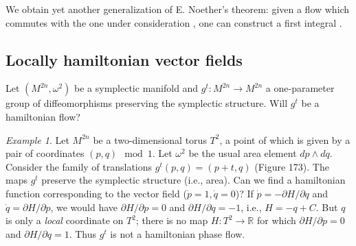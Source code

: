 \documentclass[leqno]{book}
\numberwithin{equation}{section}
\theoremstyle{plain}
\theoremstyle{definition}
\theoremstyle{remark}
\theoremstyle{smallcap}
\newtheorem*{ex*}{Example}
\numberwithin{prob}{section}
\begin{document}
We obtain yet another generalization of E. Noether's theorem:
given a flow 
which commutes with the one under consideration ,
one can construct a first integral .

\subsection{Locally hamiltonian vector fields}

Let $(M^{2n}, \omega^2)$ be a symplectic manifold and
$g^t: M^{2n} \rightarrow M^{2n}$
a one-parameter group of diffeomorphisms preserving
the symplectic structure.
%
Will $g^t$ be a hamiltonian flow?


\begin{ex*}
  Let $M^{2n}$ be a two-dimensional torus $T^2$,
  a point of which is given by a pair of coordinates
  $(p, q) \mod 1$.
  Let $\omega^2$ be the usual area element $dp \wedge dq$.
  Consider the family of translations
  $g^t(p, q) = (p + t, q)$ (Figure 173).
  The maps $g^t$ preserve the symplectic structure
  (i.e., area). Can we find a hamiltonian function
  corresponding to the vector field ($\dot p=1, \dot q = 0$)?
  If $\dot p = -\partial H/\partial q$
  and $\dot q = \partial H/\partial p$,
  we would have $\partial H/\partial p = 0$ and
  $\partial H/\partial q = -1$, i.e.,
  $H = -q + C$.
  But $q$ is only a \emph{local} coordinate on $T^2$;
  there is no map $H: T^2 \rightarrow \mathbb R$
  for which $\partial H/\partial p = 0$ and
  $\partial H/\partial q = 1$.
  Thus $g^t$ is not a hamiltonian phase flow.

  \setcounter{figure}{172}
  \begin{figure}[h]
    \centering
\end{figure}
\end{ex*}
\end{document}
